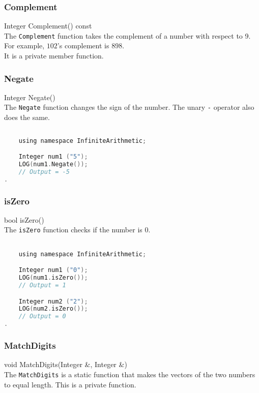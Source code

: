 \subsubsection{Complement}
{\ttfamily \large Integer Complement() const} \\[2mm]
The \verb|Complement| function takes the complement of a number with respect to 9. For example, $102$'s complement is $898$. \\
It is a private member function.


\subsubsection{Negate}
{\ttfamily \large Integer Negate()} \\[2mm]
The \verb|Negate| function changes the sign of the number. The unary \verb|-| operator also does the same.
\vspace*{1em}
\begin{lstlisting}[language = C]
	
	using namespace InfiniteArithmetic;

	Integer num1 ("5");
	LOG(num1.Negate());
	// Output = -5
.
\end{lstlisting}
\vspace*{1em}


\subsubsection{isZero}
{\ttfamily \large bool isZero()} \\[2mm]
The \verb|isZero| function checks if the number is $0$.
\vspace*{1em}
\begin{lstlisting}[language = C]

	using namespace InfiniteArithmetic;

	Integer num1 ("0");
	LOG(num1.isZero());
	// Output = 1

	Integer num2 ("2");
	LOG(num2.isZero());
	// Output = 0
.
\end{lstlisting}
\vspace*{1em}


\subsubsection{MatchDigits}
{\ttfamily \large void MatchDigits(Integer \&, Integer \&)} \\[2mm]
The \verb|MatchDigits| is a static function that makes the vectors of the two numbers to equal length. This is a private function.

